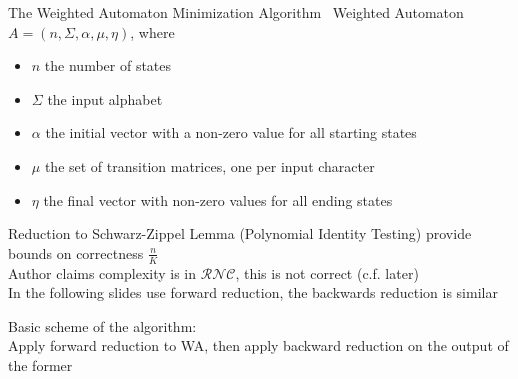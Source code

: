 \documentclass[rgb, pdf]{beamer}
\begin{document}
    \begin{frame}[allowframebreaks]{The Weighted Automaton Minimization Algorithm~\autocite{Kiefer2013OnTC}}
        Weighted Automaton $A = \left( n, \Sigma, \alpha, \mu, \eta \right)$, where
        \begin{itemize}
         \item $n$ the number of states
         \item $\Sigma$ the input alphabet
         \item $\alpha$ the initial vector with a non-zero value for all starting states
         \item $\mu$ the set of transition matrices, one per input character
         \item $\eta$ the final vector with non-zero values for all ending states
        \end{itemize}
        \vspace{7cm}
        Reduction to Schwarz-Zippel Lemma (Polynomial Identity Testing) provide bounds on correctness $\frac{n}{K}$\\ \vspace{0.5cm}
        Author claims complexity is in $\mathcal{RNC}$, this is not correct (c.f. later) \\ \vspace{0.5cm}
        In the following slides use forward reduction, the backwards reduction is similar \\ \vspace{2cm}
        
        Basic scheme of the algorithm: \\
        Apply forward reduction to WA, then apply backward reduction on the output of the former
        \framebreak
        

\end{frame}
\end{document}
